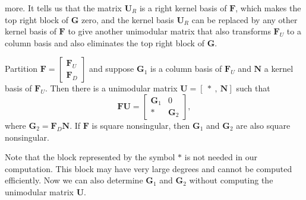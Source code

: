 more. It tells us that the matrix $\mathbf{U}_{R}$ is a right kernel
basis of $\mathbf{F}$, which makes the top right block of $\mathbf{G}$
zero, and the kernel basis $\mathbf{U}_{R}$ can be replaced by any
other kernel basis of $\mathbf{F}$ to give another unimodular matrix
that also transforms $\mathbf{F}_{U}$ to a column basis and also
eliminates the top right block of $\mathbf{G}$. 
\begin{lem}
\label{lem:oneStepHermiteDiagonal} Partition $\mathbf{F}=\begin{bmatrix}\mathbf{F}_{U}\\
\mathbf{F}_{D}
\end{bmatrix}$ and suppose $\mathbf{G}_{1}$ is a column basis of $\mathbf{F}_{U}$
and $\mathbf{N}$ a kernel basis of $\mathbf{F}_{U}$. Then there
is a unimodular matrix $\mathbf{U}=\left[~*~,~\mathbf{N}\right]$
such that 
\[
\mathbf{F}\mathbf{U}=\begin{bmatrix}\mathbf{G}_{1} & 0\\
* & \mathbf{G}_{2}
\end{bmatrix},
\]
 where $\mathbf{G}_{2}=\mathbf{F}_{D}\mathbf{N}$. If $\mathbf{F}$
is square nonsingular, then $\mathbf{G}_{1}$ and $\mathbf{G}_{2}$
are also square nonsingular. 
\end{lem}
Note that the block represented by the symbol $*$ is not needed in
our computation. This block may have very large degrees and cannot
be computed efficiently. Now we can also determine $\mathbf{G}_{1}$
and $\mathbf{G}_{2}$ without computing the unimodular matrix $\mathbf{U}$.
 

